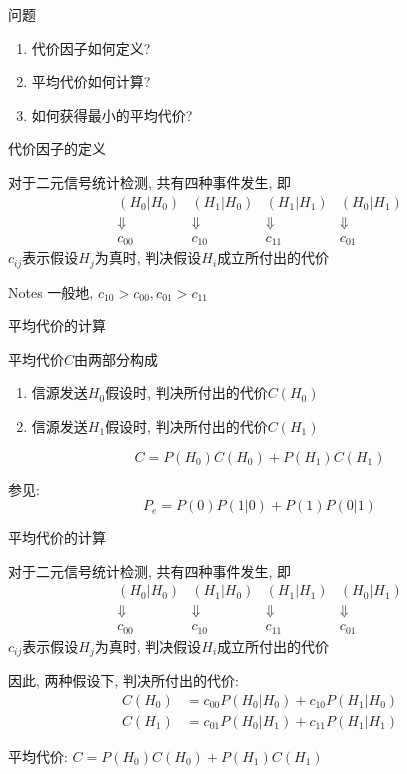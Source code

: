 \begin{frame}{问题}
\begin{enumerate}
	\item 代价因子如何定义?
	\item 平均代价如何计算?
	\item 如何获得最小的平均代价?
\end{enumerate}
\end{frame}

\begin{frame}{代价因子的定义}
\begin{block}{对于二元信号统计检测, 共有四种事件发生, 即}
$$
\begin{array}{cccc}
	(H_0|H_0) & (H_1|H_0) & (H_1|H_1) & (H_0|H_1)\\
	\Downarrow & \Downarrow & \Downarrow & \Downarrow\\
	c_{00} & c_{10} & c_{11} & c_{01}
\end{array}
$$
$c_{ij}$表示假设$H_j$为真时, 判决假设$H_i$成立所付出的代价
\end{block}
\begin{block}{Notes}
	一般地, $c_{10}>c_{00}, c_{01}>c_{11}$
\end{block}
\end{frame}

\begin{frame}{平均代价的计算}
\begin{block}{平均代价$C$由两部分构成}
	\begin{enumerate}
		\item 信源发送$H_0$假设时, 判决所付出的代价$C(H_0)$
		\item 信源发送$H_1$假设时, 判决所付出的代价$C(H_1)$
	\end{enumerate}
    \[C=P(H_0)C(H_0)+P(H_1)C(H_1)\]
\end{block}
参见:
\[ P_e=P(0)P(1|0)+P(1)P(0|1)\]
\end{frame}

\begin{frame}{平均代价的计算}
\begin{block}{对于二元信号统计检测, 共有四种事件发生, 即}
	$$
	\begin{array}{cccc}
	(H_0|H_0) & (H_1|H_0) & (H_1|H_1) & (H_0|H_1)\\
	\Downarrow & \Downarrow & \Downarrow & \Downarrow\\
	c_{00} & c_{10} & c_{11} & c_{01}
	\end{array}
	$$
	$c_{ij}$表示假设$H_j$为真时, 判决假设$H_i$成立所付出的代价
\end{block}
\begin{block}{因此, 两种假设下, 判决所付出的代价: }
   \begin{align*}
   C(H_0)&=c_{00}P(H_0|H_0)+c_{10}P(H_1|H_0)\\
   C(H_1)&=c_{01}P(H_0|H_1)+c_{11}P(H_1|H_1)
   \end{align*}
\end{block}
 平均代价: $C=P(H_0)C(H_0)+P(H_1)C(H_1)$
\end{frame}

